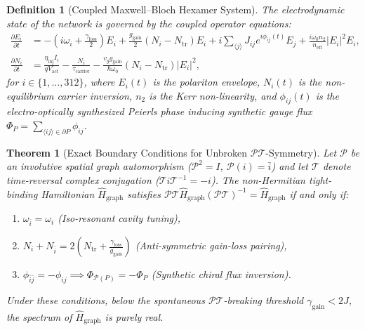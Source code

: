 \documentclass[11pt,onecolumn]{article}
\newtheorem{theorem}{Theorem}
\newtheorem{definition}{Definition}
\begin{document}
\begin{definition}[Coupled Maxwell--Bloch Hexamer System]
The electrodynamic state of the network is governed by the coupled operator equations:
\begin{align}
    \frac{\partial E_i}{\partial t} &= -\left(i\omega_i + \frac{\gamma_{\mathrm{loss}}}{2}\right)E_i + \frac{g_{\mathrm{gain}}}{2}(N_i - N_{\mathrm{tr}})E_i + i \sum_{\langle j \rangle} J_{ij} e^{i\phi_{ij}(t)} E_j + \frac{i \omega_0 n_2}{n_{\text{eff}}}|E_i|^2 E_i, \label{eq:maxwell_bloch_field} \\
    \frac{\partial N_i}{\partial t} &= \frac{\eta_{\mathrm{inj}} I_i}{q V_{\mathrm{act}}} - \frac{N_i}{\tau_{\mathrm{carrier}}} - \frac{v_g g_{\mathrm{gain}}}{\hbar \omega_0}(N_i - N_{\mathrm{tr}})|E_i|^2, \label{eq:maxwell_bloch_carrier}
\end{align}
for $i \in \{1, \dots, 312\}$, where $E_i(t)$ is the polariton envelope, $N_i(t)$ is the non-equilibrium carrier inversion, $n_2$ is the Kerr non-linearity, and $\phi_{ij}(t)$ is the electro-optically synthesized Peierls phase inducing synthetic gauge flux $\Phi_P = \sum_{\langle i j \rangle \in \partial P} \phi_{ij}$.
\end{definition}

\begin{theorem}[Exact Boundary Conditions for Unbroken $\mathcal{PT}$-Symmetry]
\label{thm:pt_symmetry_boundary}
Let $\mathcal{P}$ be an involutive spatial graph automorphism ($\mathcal{P}^2 = I$, $\mathcal{P}(i) = \bar{i}$) and let $\mathcal{T}$ denote time-reversal complex conjugation ($\mathcal{T} i \mathcal{T}^{-1} = -i$). The non-Hermitian tight-binding Hamiltonian $\hat{H}_{\mathrm{graph}}$ satisfies $\mathcal{P}\mathcal{T}\hat{H}_{\mathrm{graph}}(\mathcal{P}\mathcal{T})^{-1} = \hat{H}_{\mathrm{graph}}$ if and only if:
\begin{enumerate}
    \item $\omega_{\bar{i}} = \omega_i$ (Iso-resonant cavity tuning),
    \item $N_i + N_{\bar{i}} = 2\left(N_{\mathrm{tr}} + \frac{\gamma_{\mathrm{loss}}}{g_{\mathrm{gain}}}\right)$ (Anti-symmetric gain-loss pairing),
    \item $\phi_{\bar{i}\bar{j}} = -\phi_{ij} \implies \Phi_{\mathcal{P}(P)} = -\Phi_P$ (Synthetic chiral flux inversion).
\end{enumerate}
Under these conditions, below the spontaneous $\mathcal{PT}$-breaking threshold $\gamma_{\mathrm{gain}} < 2J$, the spectrum of $\hat{H}_{\mathrm{graph}}$ is purely real.
\end{theorem}
\end{document}
